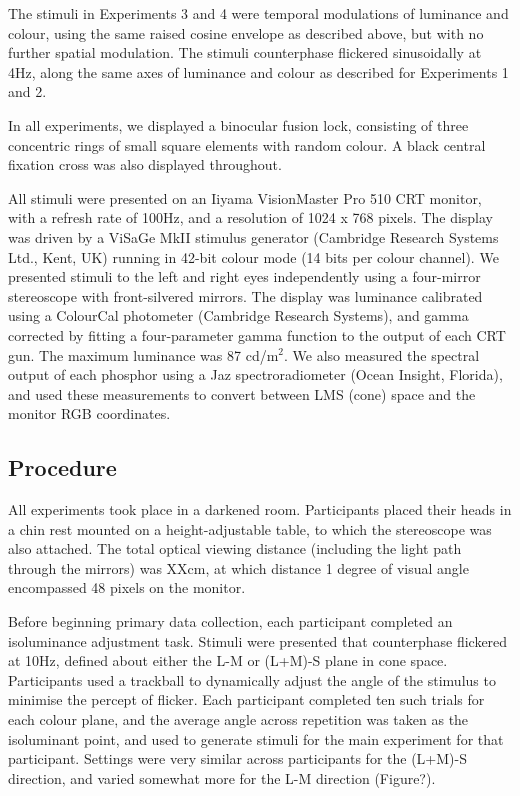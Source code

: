 \documentclass[
]{article}
\begin{document}
The stimuli in Experiments 3 and 4 were temporal modulations of luminance and colour, using the same raised cosine envelope as described above, but with no further spatial modulation. The stimuli counterphase flickered sinusoidally at 4Hz, along the same axes of luminance and colour as described for Experiments 1 and 2.

In all experiments, we displayed a binocular fusion lock, consisting of three concentric rings of small square elements with random colour. A black central fixation cross was also displayed throughout.

All stimuli were presented on an Iiyama VisionMaster Pro 510 CRT monitor, with a refresh rate of 100Hz, and a resolution of 1024 x 768 pixels. The display was driven by a ViSaGe MkII stimulus generator (Cambridge Research Systems Ltd., Kent, UK) running in 42-bit colour mode (14 bits per colour channel). We presented stimuli to the left and right eyes independently using a four-mirror stereoscope with front-silvered mirrors. The display was luminance calibrated using a ColourCal photometer (Cambridge Research Systems), and gamma corrected by fitting a four-parameter gamma function to the output of each CRT gun. The maximum luminance was 87 cd/m\(^2\). We also measured the spectral output of each phosphor using a Jaz spectroradiometer (Ocean Insight, Florida), and used these measurements to convert between LMS (cone) space and the monitor RGB coordinates.

\hypertarget{procedure}{%
\subsection{Procedure}\label{procedure}}

All experiments took place in a darkened room. Participants placed their heads in a chin rest mounted on a height-adjustable table, to which the stereoscope was also attached. The total optical viewing distance (including the light path through the mirrors) was XXcm, at which distance 1 degree of visual angle encompassed 48 pixels on the monitor.

Before beginning primary data collection, each participant completed an isoluminance adjustment task. Stimuli were presented that counterphase flickered at 10Hz, defined about either the L-M or (L+M)-S plane in cone space. Participants used a trackball to dynamically adjust the angle of the stimulus to minimise the percept of flicker. Each participant completed ten such trials for each colour plane, and the average angle across repetition was taken as the isoluminant point, and used to generate stimuli for the main experiment for that participant. Settings were very similar across participants for the (L+M)-S direction, and varied somewhat more for the L-M direction (Figure?).
\end{document}

